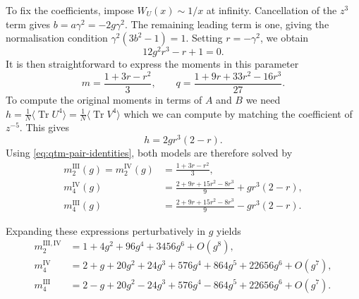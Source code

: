 To fix the coefficients, impose $W_U(x)\sim1/x$ at infinity. Cancellation of the $z^3$ term gives
$b=a\gamma^2=-2g\gamma^2$. The remaining leading term is one, giving the normalisation condition
$\gamma^2(3b^2-1)=1$. Setting $r=-\gamma^2$, we obtain
\begin{equation}
    12g^2r^3-r+1=0.
    \label{eq:qtm-r-cubic}
\end{equation}
\noindent It is then straightforward to express the moments in this parameter
\begin{equation}
    m=\frac{1+3r-r^2}{3},\qquad
    q=\frac{1+9r+33r^2-16r^3}{27}.
    \label{eq:qtm-mq-solution}
\end{equation}
\noindent To compute the original moments in terms of $A$ and $B$ we need $h=\frac1N\bigl\langle\operatorname{Tr}U^4\bigr\rangle
    =\frac1N\bigl\langle\operatorname{Tr}V^4\bigr\rangle$ which we can compute by matching the coefficient of $z^{-5}$. This gives
\begin{equation}
    h=2gr^3(2-r).
    \label{eq:qtm-h}
\end{equation}
Using \eqref{eq:qtm-pair-identities}, both models are therefore solved by
\begin{equation}
    \begin{aligned}
        m_2^{\mathrm{III}}(g)=m_2^{\mathrm{IV}}(g)
         & =\frac{1+3r-r^2}{3}, \\
        m_4^{\mathrm{IV}}(g)
         & =\frac{2+9r+15r^2-8r^3}{9}+gr^3(2-r), \\
        m_4^{\mathrm{III}}(g)
         & =\frac{2+9r+15r^2-8r^3}{9}-gr^3(2-r).
    \end{aligned}
    \label{eq:qtm-original-moments}
\end{equation}

Expanding these expressions perturbatively in $g$ yields
\begin{align}
    m_2^{\mathrm{III},\mathrm{IV}}
     & =1+4g^2+96g^4+3456g^6+O(g^8),\label{eq:qtm-second-series-m2} \\
    m_4^{\mathrm{IV}}
     & =2+g+20g^2+24g^3+576g^4+864g^5+22656g^6+O(g^7), \\
    m_4^{\mathrm{III}}
     & =2-g+20g^2-24g^3+576g^4-864g^5+22656g^6+O(g^7).
    \label{eq:qtm-second-series-m4}
\end{align}

